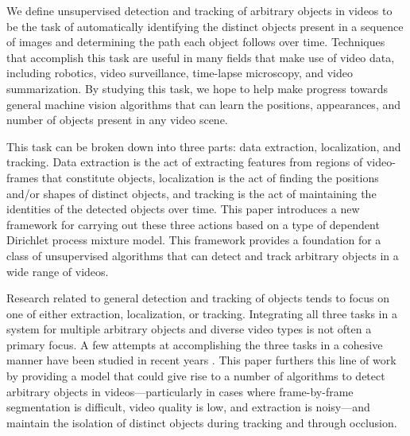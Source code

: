 \documentclass[twocolumn, final]{svjour3}
\begin{document}
We define unsupervised detection and tracking of arbitrary objects in videos to be the task of automatically identifying the distinct objects present in a sequence of images and determining the path each object follows over time. Techniques that accomplish this task are useful in many fields that make use of video data, including robotics, video surveillance, time-lapse microscopy, and video summarization. By studying this task, we hope to help make progress towards general machine vision algorithms that can learn the positions, appearances, and number of objects present in any video scene.

This task can be broken down into three parts: data extraction, localization, and tracking. Data extraction is the act of extracting features from regions of video-frames that constitute objects, localization is the act of finding the positions and/or shapes of distinct objects, and tracking is the act of maintaining the identities of the detected objects over time. This paper introduces a new framework for carrying out these three actions based on a type of dependent Dirichlet process mixture model. This framework provides a foundation for a class of unsupervised algorithms that can detect and track arbitrary objects in a wide range of videos.

Research related to general detection and tracking of objects tends to focus on one of either extraction, localization, or tracking. Integrating all three tasks in a system for multiple arbitrary objects and diverse video types is not often a primary focus. A few attempts at accomplishing the three tasks in a cohesive manner have been studied in recent years \cite{brostow2006unsupervised, brox2010object, fragkiadaki2011detection, pece_2002}.
This paper furthers this line of work by providing a model that could give rise to a number of algorithms to detect arbitrary objects in videos---particularly in cases where frame-by-frame segmentation is difficult, video quality is low, and extraction is noisy---and maintain the isolation of distinct objects during tracking and through occlusion.
\end{document}
